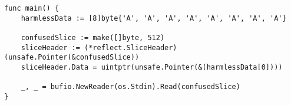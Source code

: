 \begin{lstlisting}[language=Golang, label=lst:buffer-overflow, caption=Buffer overflow leading to code flow redirection]
func main() {
    harmlessData := [8]byte{'A', 'A', 'A', 'A', 'A', 'A', 'A', 'A'}

    confusedSlice := make([]byte, 512)
    sliceHeader := (*reflect.SliceHeader)(unsafe.Pointer(&confusedSlice))
    sliceHeader.Data = uintptr(unsafe.Pointer(&(harmlessData[0])))

    _, _ = bufio.NewReader(os.Stdin).Read(confusedSlice)
}
\end{lstlisting}
